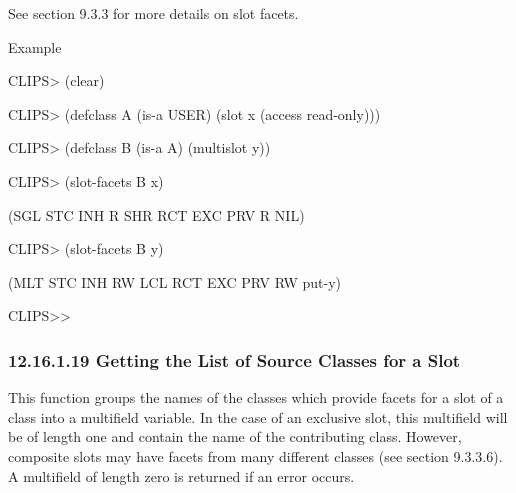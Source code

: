 \documentclass[letterpaper,10pt,english]{sphinxmanual}
\begin{document}
See section 9.3.3 for more details on slot facets.


\begin{sphinxVerbatim}[commandchars=\\\{\}]
  
\end{sphinxVerbatim}

Example

CLIPS\textgreater{} (clear)

CLIPS\textgreater{} (defclass A (is-a USER) (slot x (access read-only)))

CLIPS\textgreater{} (defclass B (is-a A) (multislot y))

CLIPS\textgreater{} (slot-facets B x)

(SGL STC INH R SHR RCT EXC PRV R NIL)

CLIPS\textgreater{} (slot-facets B y)

(MLT STC INH RW LCL RCT EXC PRV RW put-y)

CLIPS\textgreater{}\textgreater{}


\subsubsection{12.16.1.19 Getting the List of Source Classes for a Slot}
\label{\detokenize{actions:getting-the-list-of-source-classes-for-a-slot}}
This function groups the names of the classes which provide facets for a
slot of a class into a multifield variable. In the case of an exclusive
slot, this multifield will be of length one and contain the name of the
contributing class. However, composite slots may have facets from many
different classes (see section 9.3.3.6). A multifield of length zero is
returned if an error occurs.


\begin{sphinxVerbatim}[commandchars=\\\{\}]
  
\end{sphinxVerbatim}
\end{document}
